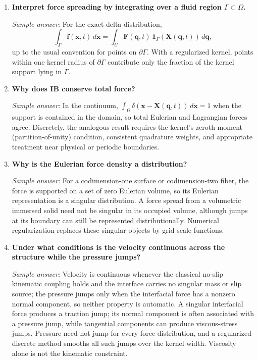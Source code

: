 \documentclass[11pt]{article}
\begin{document}
\begin{enumerate}[label=\arabic*., resume]

\item \textbf{Interpret force spreading by integrating over a fluid region $\Gamma \subset \Omega$.}

\textit{Sample answer:}  
For the exact delta distribution,
\[
\int_\Gamma\mathbf{f}(\mathbf{x},t)\,d\mathbf{x}
=\int_U\mathbf{F}(\mathbf{q},t)\,
\mathbf{1}_{\Gamma}(\mathbf{X}(\mathbf{q},t))\,d\mathbf{q},
\]
up to the usual convention for points on $\partial\Gamma$. With a regularized
kernel, points within one kernel radius of $\partial\Gamma$ contribute only the
fraction of the kernel support lying in $\Gamma$.

\item \textbf{Why does IB conserve total force?}

\textit{Sample answer:}  
In the continuum, $\int_\Omega\delta(\mathbf{x}-\mathbf{X}(\mathbf{q},t))\,d\mathbf{x}=1$
when the support is contained in the domain, so total Eulerian and Lagrangian
forces agree. Discretely, the analogous result requires the kernel's zeroth
moment (partition-of-unity) condition, consistent quadrature weights, and
appropriate treatment near physical or periodic boundaries.

\item \textbf{Why is the Eulerian force density a distribution?}

\textit{Sample answer:}  
For a codimension-one surface or codimension-two fiber, the force is supported
on a set of zero Eulerian volume, so its Eulerian representation is a singular
distribution. A force spread from a volumetric immersed solid need not be
singular in its occupied volume, although jumps at its boundary can still be
represented distributionally. Numerical regularization replaces these singular
objects by grid-scale functions.

\item \textbf{Under what conditions is the velocity continuous across the structure while the pressure jumps?}

\textit{Sample answer:}
Velocity is continuous whenever the classical no-slip kinematic coupling holds
and the interface carries no singular mass or slip source; the pressure jumps
only when the interfacial force has a nonzero normal component, so neither
property is automatic. A singular interfacial force produces
a traction jump; its normal component is often associated with a pressure jump,
while tangential components can produce viscous-stress jumps. Pressure need not
jump for every force distribution, and a regularized discrete method smooths
all such jumps over the kernel width. Viscosity alone is not the kinematic
constraint.

\end{enumerate}
\end{document}
